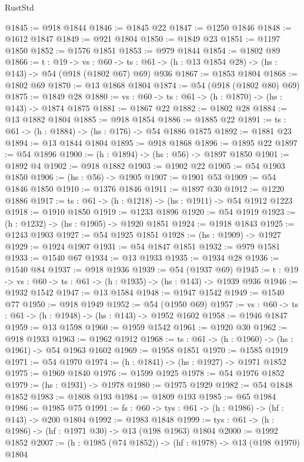 \begin{lexlean}{RustStd}
\begin{coremodule}
@1845 := @918 @1844
@1846 := @1845 @22
@1847 := @1250 @1846
@1848 := @1612 @1847
@1849 := @921 @1804
@1850 := @1849 @23
@1851 := @1197 @1850
@1852 := @1576 @1851
@1853 := @979 @1844
@1854 := @1802 @89
@1866 := {t : @19} ->
  {vs : @60} -> {ts : @61} -> (h : @13 @1854 @28) -> (hs : @143) -> @54 (@918 (@1802 @67) @69) @936
@1867 := @1853 @1804
@1868 := @1802 @69
@1870 := @13 @1868 @1804
@1874 := @54 (@918 (@1802 @80) @69)
@1875 := @1849 @28
@1880 := {vs : @60} -> {ts : @61} -> (h : @1870) -> (hs : @143) -> @1874 @1875
@1881 := @1867 @22
@1882 := @1802 @28
@1884 := @13 @1882 @1804
@1885 := @918 @1854
@1886 := @1885 @22
@1891 := {ts : @61} -> (h : @1884) -> (hs : @176) -> @54 @1886 @1875
@1892 := @1881 @23
@1894 := @13 @1844 @1804
@1895 := @918 @1868
@1896 := @1895 @22
@1897 := @54 @1896
@1900 := (h : @1894) -> (hs : @56) -> @1897 @1850
@1901 := @1892 @4
@1902 := @918 @1882
@1903 := @1902 @22
@1905 := @54 @1903 @1850
@1906 := (hs : @56) -> @1905
@1907 := @1901 @53
@1909 := @54 @1846 @1850
@1910 := @1376 @1846
@1911 := @1897 @30
@1912 := @1220 @1886
@1917 := {ts : @61} -> (h : @1218) -> (hs : @1911) -> @54 @1912 @1223
@1918 := @1910 @1850
@1919 := @1233 @1896
@1920 := @54 @1919
@1923 := (h : @1232) -> (hs : @1905) -> @1920 @1851
@1924 := @1918 @1843
@1925 := @1243 @1903
@1927 := @54 @1925 @1851
@1928 := (hs : @1909) -> @1927
@1929 := @1924 @1907
@1931 := @54 @1847 @1851
@1932 := @979 @1581
@1933 := @1540 @67
@1934 := @13 @1933
@1935 := @1934 @28
@1936 := @1540 @84
@1937 := @918 @1936
@1939 := @54 (@1937 @69)
@1945 := {t : @19} -> {vs : @60} -> {ts : @61} -> (h : @1935) -> (hs : @143) -> @1939 @936
@1946 := @1932 @1542
@1947 := @13 @1584
@1948 := @1947 @1542
@1949 := @1540 @77
@1950 := @918 @1949
@1952 := @54 (@1950 @69)
@1957 := {vs : @60} -> {ts : @61} -> (h : @1948) -> (hs : @143) -> @1952 @1602
@1958 := @1946 @1847
@1959 := @13 @1598
@1960 := @1959 @1542
@1961 := @1920 @30
@1962 := @918 @1933
@1963 := @1962 @1912
@1968 := {ts : @61} -> (h : @1960) -> (hs : @1961) -> @54 @1963 @1602
@1969 := @1958 @1851
@1970 := @1585 @1919
@1971 := @54 @1970
@1974 := (h : @1841) -> (hs : @1927) -> @1971 @1852
@1975 := @1969 @1840
@1976 := @1599 @1925
@1978 := @54 @1976 @1852
@1979 := (hs : @1931) -> @1978
@1980 := @1975 @1929
@1982 := @54 @1848 @1852
@1983 := @1808 @193
@1984 := @1809 @193
@1985 := @65 @1984
@1986 := @1985 @75
@1991 := {fs : @60} -> {tys : @61} -> (h : @1986) -> (hf : @143) -> @200 @1804
@1992 := @1983 @1848
@1999 := {tys : @61} -> (h : @1986) -> (hf : @1971 @30) -> @13 (@198 @1963) @1804
@2000 := @1992 @1852
@2007 := (h : @1985 (@74 @1852)) -> (hf : @1978) -> @13 (@198 @1970) @1804

\end{coremodule}
\end{lexlean}
